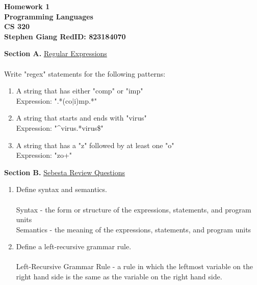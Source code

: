 \documentclass[11pt]{article}
\newcommand{\skipline}{\vspace{\baselineskip}}
\newenvironment{problem}[1]{\textbf{Section #1 }}{}
\begin{document}
	
	\begin{center}
		\textbf{Homework 1} \\
		\textbf{Programming Languages} \\
		\textbf{CS 320} \\
		\textbf{Stephen Giang RedID: 823184070} \\
	\end{center}
	\skipline
	\skipline
	\begin{problem}{A.}\underline{Regular Expressions} 
		\\ \\
		Write "regex" statements for the following patterns:
		\begin{enumerate}[label = (\alph*)]
			\item A string that has either "comp" or "imp"  \\
			Expression: ".*(co$|$i)mp.*" 
			\item A string that starts and ends with "virus" \\
			Expression: "\^{}virus.*virus\$" 
			\item A string that has a "z" followed by at least one "o" \\
			Expression: "zo+" 
		\end{enumerate}
	\end{problem}
	\skipline
	\skipline
	\begin{problem}{B.}\underline{Sebesta Review Questions}
		\begin{enumerate}[label = (\alph*)]
			\item Define syntax and semantics. 
			\\ \\
			Syntax - the form or structure of the expressions, statements, and program units \\
			Semantics - the meaning of the expressions, statements, and program units
			\item Define a left-recursive grammar rule. 
			\\ \\
			Left-Recursive Grammar Rule - a rule in which the leftmost variable on the right hand side  is the same as the variable on the right hand side.
		\end{enumerate}
	\end{problem}
	\newpage
\end{document}
